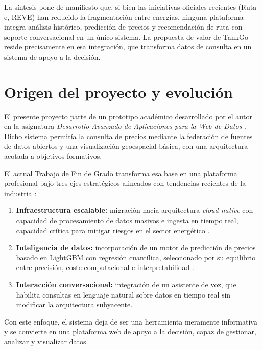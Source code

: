 La síntesis pone de manifiesto que, si bien las iniciativas oficiales recientes (Ruta-e,
REVE) han reducido la fragmentación entre energías, ninguna plataforma integra análisis
histórico, predicción de precios y recomendación de ruta con soporte conversacional en
un único sistema. La propuesta de valor de TankGo reside precisamente en esa
integración, que transforma datos de consulta en un sistema de apoyo a la decisión.

\section{Origen del proyecto y evolución}

El presente proyecto parte de un prototipo académico desarrollado por el autor en la
asignatura \textit{Desarrollo Avanzado de Aplicaciones para la Web de Datos}
\cite{Alvis2025TankGo}. Dicho sistema permitía la consulta de precios mediante la
federación de fuentes de datos abiertos y una visualización geoespacial básica, con una
arquitectura acotada a objetivos formativos.

El actual Trabajo de Fin de Grado transforma esa base en una plataforma profesional bajo
tres ejes estratégicos alineados con tendencias recientes de la industria
\cite{Gartner2026Trends}:

\begin{enumerate}
  \item \textbf{Infraestructura escalable:} migración hacia arquitectura
        \textit{cloud-native} con capacidad de procesamiento de datos masivos e ingesta
        en tiempo real, capacidad crítica para mitigar riesgos en el sector energético
        \cite{s24124013}.
  \item \textbf{Inteligencia de datos:} incorporación de un motor de predicción de
        precios basado en LightGBM con regresión cuantílica, seleccionado por su equilibrio
        entre precisión, coste computacional e interpretabilidad
        \cite{LAHMIRI2024105008, s24124013}.
  \item \textbf{Interacción conversacional:} integración de un asistente de voz,
        que habilita consultas en lenguaje natural sobre datos en tiempo real
        sin modificar la arquitectura subyacente.
\end{enumerate}

Con este enfoque, el sistema deja de ser una herramienta meramente informativa y se convierte en una plataforma web de apoyo a la decisión,
capaz de gestionar, analizar y visualizar datos.


